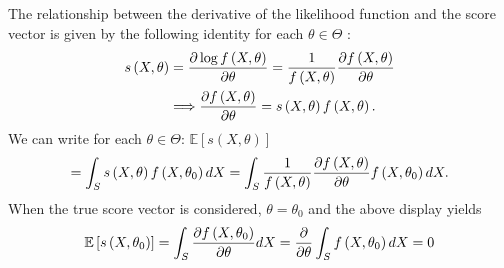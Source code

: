 \documentclass[notes=show]{beamer}
\begin{document}
\begin{frame}%


The relationship between the derivative of the likelihood function and the
score vector is given by the following identity for each $\theta \in \Theta $%
:%
\begin{align}
s\left( X,\theta \right) & =\frac{\partial \log f\left( X,\theta \right) }{%
\partial \theta }=\frac{1}{f\left( X,\theta \right) }\frac{\partial f\left(
X,\theta \right) }{\partial \theta }  \notag \\
& \Longrightarrow \frac{\partial f\left( X,\theta \right) }{\partial \theta }%
=s\left( X,\theta \right) f\left( X,\theta \right) .  \label{2.17}
\end{align}%
We can write for each $\theta \in \Theta $: $\mathbb{E}\left[ s\left(
X,\theta \right) \right] $%
\begin{equation*}
=\int_{S}s\left( X,\theta \right) f\left( X,\theta _{0}\right) dX=\int_{S}%
\frac{1}{f\left( X,\theta \right) }\frac{\partial f\left( X,\theta \right) }{%
\partial \theta }f\left( X,\theta _{0}\right) dX.
\end{equation*}%
When the true score vector is considered, $\theta =\theta _{0}$ and the
above display yields%
\begin{equation*}
\mathbb{E}\left[ s\left( X,\theta _{0}\right) \right] =\int_{S}\frac{%
\partial f\left( X,\theta _{0}\right) }{\partial \theta }dX=\frac{\partial }{%
\partial \theta }\int_{S}f\left( X,\theta _{0}\right) dX=0
\end{equation*}

\end{frame}%
\end{document}
